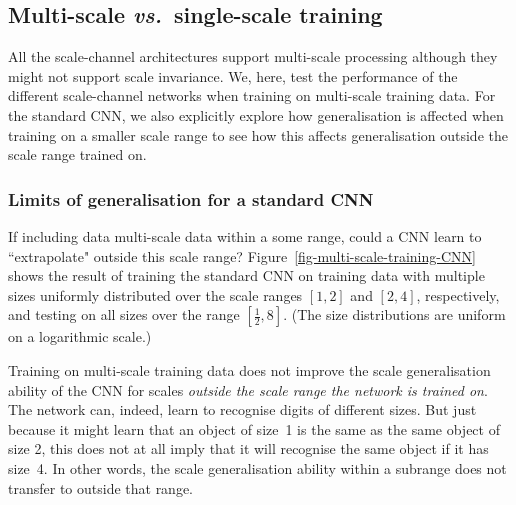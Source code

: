 \documentclass[twocolumn,runningheads]{svjour3}
\begin{document}
\subsection{Multi-scale {\em vs.\/}\ single-scale training}
\label{sec-multi-scale_vs_singlescale}

All the scale-channel architectures support multi-scale processing
although they might not support scale invariance. We, here, test the
performance of the different scale-channel networks when training on
multi-scale training data. For the standard CNN, we also explicitly explore how generalisation is affected when training on a smaller scale range to see how this affects generalisation outside the scale range trained on. 

\subsubsection{Limits of generalisation for a standard CNN}

If including data multi-scale data within a some range, could a CNN learn to ``extrapolate" outside this scale range? Figure~\ref{fig-multi-scale-training-CNN} shows the result of training
the standard CNN on training data with multiple sizes uniformly distributed over the scale ranges $[1, 2]$ and $[2, 4]$, respectively, and testing on all sizes
over the range $[\frac{1}{2}, 8]$. (The size distributions are uniform on a
logarithmic scale.)

Training on multi-scale training
data does not improve the scale generalisation ability of the CNN for
scales {\em outside the scale range the network is trained on}.
The network can, indeed, learn to recognise digits of different
sizes. But just because it might learn that an object of
size~1 is the same as the same object of size 2, this does
not at all imply that it will recognise the same object if it has
size~4. In other words, the scale generalisation ability within a
subrange does not transfer to outside that range.
\end{document}
